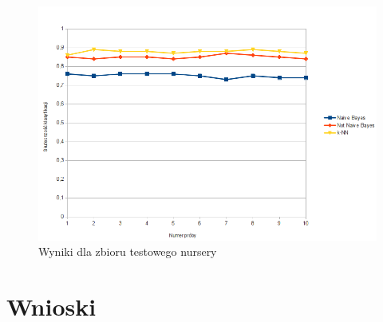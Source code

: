\documentclass[paper=a4, fontsize=11pt]{scrartcl} %
\numberwithin{equation}{section} %
\numberwithin{figure}{section} %
\numberwithin{table}{section} %
\begin{document}
\begin{figure}[h]
 \centering
\includegraphics[width=150mm]{nursery.png}
 \caption{Wyniki dla zbioru testowego nursery}
 \label{fig:model_drzewa}
\end{figure}

\section{Wnioski}

\newpage


 
\end{document}
